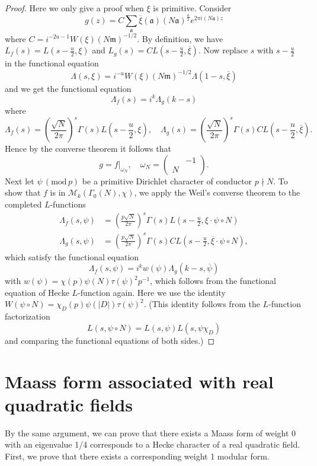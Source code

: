 \documentclass{article}
\newcommand{\Mod}[1]{\,(\mathrm{mod}\,#1)}
\begin{document}
\begin{proof}
Here we only give a proof when $\xi$ is primitive. Consider 
$$
g(z) = C\sum_{\mathfrak{a}}\overline{\xi}(\mathfrak{a})(N\mathfrak{a})^{\frac{u}{2}}e^{2\pi i (N\mathfrak{a})z}
$$
where $C = i^{-2u-1}W(\xi)(N\mathfrak{m})^{-1/2}$. By definition, we have $L_{f}(s) = L(s - \frac{u}{2}, \xi)$ and $L_{g}(s) = CL(s-\frac{u}{2},\overline{\xi})$.
Now replace $s$ with $s-\frac{u}{2}$ in the functional equation 
$$
\Lambda(s, \xi) = i^{-u}W(\xi)(N\mathfrak{m})^{-1/2}\Lambda(1-s, \overline{\xi})
$$
and we get the functional equation $$\Lambda_{f}(s) = i^{k}\Lambda_{g}(k-s)$$ where
$$
\Lambda_{f}(s) = \left(\frac{\sqrt{N}}{2\pi}\right)^{s} \Gamma(s) L\left( s- \frac{u}{2}, \xi\right), \quad \Lambda_{g}(s) = \left(\frac{\sqrt{N}}{2\pi}\right)^{s} \Gamma(s) CL\left( s- \frac{u}{2}, \overline{\xi}\right).
$$
Hence by the converse theorem it follows that 
$$
g = f|_{\omega_{N}}, \quad \omega_{N} = \begin{pmatrix} & -1 \\ N & \end{pmatrix}. 
$$
Next let $\psi\Mod{p}$ be a primitive Dirichlet character of conductor $p\nmid N$. 
To show that $f$ is in $\mathcal{M}_{k}(\Gamma_{0}(N), \chi)$, we apply the Weil's converse theorem to the completed $L$-functions 
\begin{align*}
\Lambda_{f}(s, \psi) &= \left(\frac{p\sqrt{N}}{2\pi}\right)^{s} \Gamma(s) L\left( s - \frac{u}{2}, \xi\cdot \psi\circ N\right) \\
\Lambda_{g}(s, \psi) &= \left(\frac{p\sqrt{N}}{2\pi}\right)^{s} \Gamma(s) CL\left( s - \frac{u}{2}, \overline{\xi}\cdot \psi\circ N\right), 
\end{align*}
which satisfy the functional equation $$\Lambda_{f}(s, \psi) = i^{k}w(\psi)\Lambda_{g}(k-s, \overline{\psi})$$
with $w(\psi) = \chi(p)\psi(N)\tau(\psi)^{2}p^{-1}$, which follows from the functional equation of Hecke $L$-function again. Here we use the identity $W(\psi\circ N) = \chi_{D}(p)\psi(|D|)\tau(\psi)^{2}$. (This identity follows from the $L$-function factorization 
$$
L(s, \psi\circ N) = L(s, \psi)L(s, \psi\chi_{D})
$$
and comparing the functional equations of both sides.)
\end{proof}

\section{Maass form associated with real quadratic fields}
By the same argument, we can prove that there exists a Maass form of weight 0 with an eigenvalue 1/4 corresponds to a Hecke character of a real quadratic field. 
First, we prove that there exists a corresponding weight 1 modular form.
\end{document}

